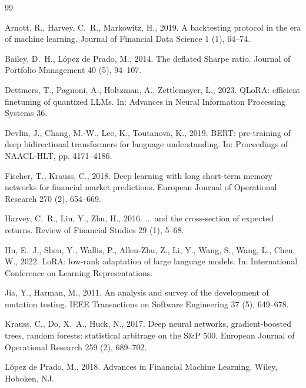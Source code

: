 \documentclass[preprint,12pt,authoryear]{elsarticle}
\begin{document}
\begin{thebibliography}{99}

Arnott, R., Harvey, C.~R., Markowitz, H., 2019.
A backtesting protocol in the era of machine learning.
Journal of Financial Data Science 1 (1), 64--74.

Bailey, D.~H., L\'opez de Prado, M., 2014.
The deflated Sharpe ratio.
Journal of Portfolio Management 40 (5), 94--107.

Dettmers, T., Pagnoni, A., Holtzman, A., Zettlemoyer, L., 2023.
QLoRA: efficient finetuning of quantized LLMs.
In: Advances in Neural Information Processing Systems 36.

Devlin, J., Chang, M.-W., Lee, K., Toutanova, K., 2019.
BERT: pre-training of deep bidirectional transformers for language understanding.
In: Proceedings of NAACL-HLT, pp. 4171--4186.

Fischer, T., Krauss, C., 2018.
Deep learning with long short-term memory networks for financial market
predictions.
European Journal of Operational Research 270 (2), 654--669.

Harvey, C.~R., Liu, Y., Zhu, H., 2016.
$\dots$ and the cross-section of expected returns.
Review of Financial Studies 29 (1), 5--68.

Hu, E.~J., Shen, Y., Wallis, P., Allen-Zhu, Z., Li, Y., Wang, S., Wang, L.,
Chen, W., 2022.
LoRA: low-rank adaptation of large language models.
In: International Conference on Learning Representations.

Jia, Y., Harman, M., 2011.
An analysis and survey of the development of mutation testing.
IEEE Transactions on Software Engineering 37 (5), 649--678.

Krauss, C., Do, X.~A., Huck, N., 2017.
Deep neural networks, gradient-boosted trees, random forests: statistical
arbitrage on the S\&P 500.
European Journal of Operational Research 259 (2), 689--702.

L\'opez de Prado, M., 2018.
Advances in Financial Machine Learning.
Wiley, Hoboken, NJ.


\end{thebibliography}
\end{document}
